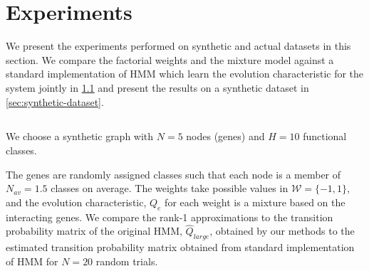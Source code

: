 \documentclass{bioinfo}
\begin{document}
\begin{methods}



\end{methods}
\section{Experiments}
We present the experiments performed on synthetic and actual datasets
in this section. We compare the factorial weights and the mixture
model against a standard implementation of HMM which learn
the evolution characteristic for the system jointly in
\ref{sec:validation} and present the results on a synthetic dataset in \ref{sec:synthetic-dataset}.

\subsection{}
\label{sec:validation}
We choose a synthetic graph with $N=5$ nodes (genes) and $H=10$ functional
classes. 

The genes are randomly assigned classes  such that each
node is a member of $N_{av}=1.5$ classes on average. The weights take
possible values in ${\mathcal W} = \{-1, 1\}$, and the evolution characteristic, $Q_{e}$ for
each weight is a mixture based on the interacting genes.  We compare
the rank-1 approximations to the transition probability matrix of the
original HMM, $\hat{Q}_{large}$,  obtained by our methods to the
estimated transition probability matrix obtained from standard implementation of 
HMM for $N=20$ random trials. 
\end{document}
